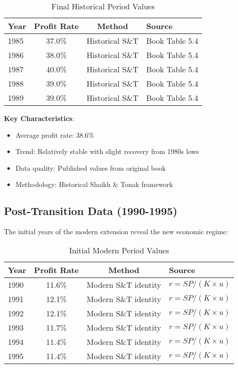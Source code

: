 \documentclass[12pt]{article}
\begin{document}
\begin{table}[h]
\centering
\begin{tabular}{lccl}
\toprule
\textbf{Year} & \textbf{Profit Rate} & \textbf{Method} & \textbf{Source} \\
\midrule
1985 & 37.0\% & Historical S\&T & Book Table 5.4 \\
1986 & 38.0\% & Historical S\&T & Book Table 5.4 \\
1987 & 40.0\% & Historical S\&T & Book Table 5.4 \\
1988 & 39.0\% & Historical S\&T & Book Table 5.4 \\
1989 & 39.0\% & Historical S\&T & Book Table 5.4 \\
\bottomrule
\end{tabular}
\caption{Final Historical Period Values}
\label{tab:pre_transition}
\end{table}

\textbf{Key Characteristics}:
\begin{itemize}
    \item Average profit rate: 38.6\%
    \item Trend: Relatively stable with slight recovery from 1980s lows
    \item Data quality: Published values from original book
    \item Methodology: Historical Shaikh \& Tonak framework
\end{itemize}

\subsection{Post-Transition Data (1990-1995)}

The initial years of the modern extension reveal the new economic regime:

\begin{table}[h]
\centering
\begin{tabular}{lccl}
\toprule
\textbf{Year} & \textbf{Profit Rate} & \textbf{Method} & \textbf{Source} \\
\midrule
1990 & 11.6\% & Modern S\&T identity & $r = SP/(K \times u)$ \\
1991 & 12.1\% & Modern S\&T identity & $r = SP/(K \times u)$ \\
1992 & 12.1\% & Modern S\&T identity & $r = SP/(K \times u)$ \\
1993 & 11.7\% & Modern S\&T identity & $r = SP/(K \times u)$ \\
1994 & 11.4\% & Modern S\&T identity & $r = SP/(K \times u)$ \\
1995 & 11.4\% & Modern S\&T identity & $r = SP/(K \times u)$ \\
\bottomrule
\end{tabular}
\caption{Initial Modern Period Values}
\label{tab:post_transition}
\end{table}
\end{document}
